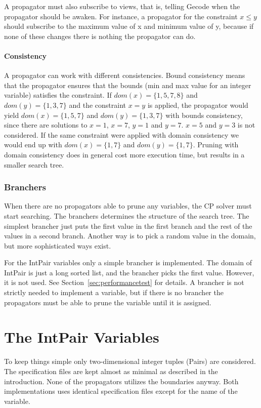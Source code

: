 \documentclass[a4paper,11pt]{article}
\begin{document}
A propagator must also subscribe to views, that is, telling Gecode when the propagator should be awaken. For instance, a propagator for the constraint $x\le y$ should subscribe to the maximum value of x and minimum value of y, because if none of these changes there is nothing the propagator can do.

\paragraph{Consistency}
A propagator can work with different consistencies. Bound consistency means that the propagator ensures that the bounds (min and max value for an integer variable) satisfies the constraint. If $dom(x)=\{1,5,7,8\}$ and $dom(y)=\{1,3,7\}$ and the constraint $x=y$ is applied, the propagator would yield $dom(x)=\{1,5,7\}$ and $dom(y)=\{1,3,7\}$ with bounds consistency, since there are solutions to $x=1$, $x=7$, $y=1$ and $y=7$. $x=5$ and $y=3$ is not considered. If the same constraint were applied with domain consistency we would end up with $dom(x)=\{1,7\}$ and $dom(y)=\{1,7\}$. Pruning with domain consistency does in general cost more execution time, but results in a smaller search tree.

\subsubsection{Branchers}
When there are no propagators able to prune any variables, the CP solver must start searching. The branchers determines the structure of the search tree. The simplest brancher just puts the first value in the first branch and the rest of the values in a second branch. Another way is to pick a random value in the domain, but more sophisticated ways exist. 

For the IntPair variables only a simple brancher is implemented. The domain of IntPair is just a long sorted list, and the brancher picks the first value. However, it is not used. See Section~\ref{sec:performancetest} for details. A brancher is not strictly needed to implement a variable, but if there is no brancher the propagators must be able to prune the variable until it is assigned. 

\section{The IntPair Variables}
To keep things simple only two-dimensional integer tuples (Pairs) are considered. The specification files are kept almost as minimal as described in the introduction. None of the propagators utilizes the boundaries anyway. Both implementations uses identical specification files except for the name of the variable. 
\end{document}
